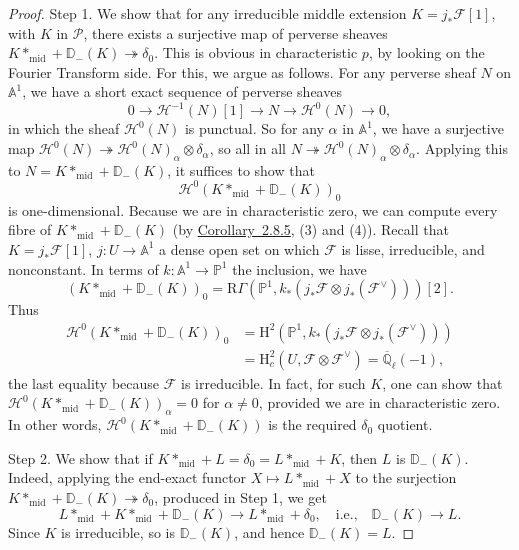 \begin{proof}
Step 1. We show that for any irreducible middle extension
\(K=j_*\mathcal{F}[1]\), with \(K\) in \(\mathcal{P}\), there exists a
surjective map of perverse sheaves \(K*_{\mathrm{mid}}+\mathbb{D}_{-}(K)\twoheadrightarrow
\delta_0\). This is obvious in characteristic \(p\), by looking on the Fourier
Transform side. For this, we argue as follows. For any perverse sheaf \(N\) on
\(\mathbb{A}^1\), we have a short exact sequence of perverse sheaves
\[
  0\to\mathcal{H}^{-1}(N)[1]\to N\to\mathcal{H}^0(N)\to 0,
\]
in which the sheaf \(\mathcal{H}^0(N)\) is punctual. So for any \(\alpha\) in
\(\mathbb{A}^1\), we have a surjective map
\(\mathcal{H}^0(N)\twoheadrightarrow\mathcal{H}^0(N)_\alpha\otimes\delta_\alpha\),
so all in all \(N\twoheadrightarrow\mathcal{H}^0(N)_\alpha\otimes\delta_\alpha\).
Applying this to \(N=K*_{\mathrm{mid}}+\mathbb{D}_{-}(K)\), it suffices to show
that
\[
  \mathcal{H}^0(K*_{\mathrm{mid}}+\mathbb{D}_{-}(K))_0
\]
is one-dimensional. Because we are in characteristic zero, we can compute every
fibre of \(K*_{\mathrm{mid}}+\mathbb{D}_{-}(K)\) (by
\hyperref[cor:2.8.5]{Corollary~2.8.5}, (3) and (4)). Recall that
\(K=j_*\mathcal{F}[1]\), \(j:U\to\mathbb{A}^1\) a dense open set on which
\(\mathcal{F}\) is lisse, irreducible, and nonconstant. In terms of
\(k:\mathbb{A}^1\to\mathbb{P}^1\) the inclusion, we have
\[
  (K*_{\mathrm{mid}}+\mathbb{D}_{-}(K))_0
  =
  \mathrm{R}\Gamma(\mathbb{P}^1,k_*(j_*\mathcal{F}\otimes j_*(\mathcal{F}^{\vee})))[2].
\]
Thus
\[
  \begin{aligned}
  \mathcal{H}^0(K*_{\mathrm{mid}}+\mathbb{D}_{-}(K))_0
    &=
  \mathrm{H}^2(\mathbb{P}^1,k_*(j_*\mathcal{F}\otimes j_*(\mathcal{F}^{\vee})))\\
    &=
  \mathrm{H}^2_c(U,\mathcal{F}\otimes\mathcal{F}^{\vee})
  =\overline{\mathbb{Q}}_\ell(-1),
  \end{aligned}
\]
the last equality because \(\mathcal{F}\) is irreducible. In fact, for such
\(K\), one can show that
\(\mathcal{H}^0(K*_{\mathrm{mid}}+\mathbb{D}_{-}(K))_\alpha=0\) for
\(\alpha\neq 0\), provided we are in characteristic zero. In other words,
\(\mathcal{H}^0(K*_{\mathrm{mid}}+\mathbb{D}_{-}(K))\) is the required
\(\delta_0\) quotient.

Step 2. We show that if \(K*_{\mathrm{mid}}+L=\delta_0=L*_{\mathrm{mid}}+K\),
then \(L\) is \(\mathbb{D}_{-}(K)\). Indeed, applying the end-exact functor
\(X\mapsto L*_{\mathrm{mid}}+X\) to the surjection
\(K*_{\mathrm{mid}}+\mathbb{D}_{-}(K)\twoheadrightarrow\delta_0\), produced in
Step 1, we get
\[
  L*_{\mathrm{mid}}+K*_{\mathrm{mid}}+\mathbb{D}_{-}(K)
  \to L*_{\mathrm{mid}}+\delta_0,
  \quad\text{i.e.,}\quad
  \mathbb{D}_{-}(K)\to L.
\]
Since \(K\) is irreducible, so is \(\mathbb{D}_{-}(K)\), and hence
\(\mathbb{D}_{-}(K)=L\).


\end{proof}
